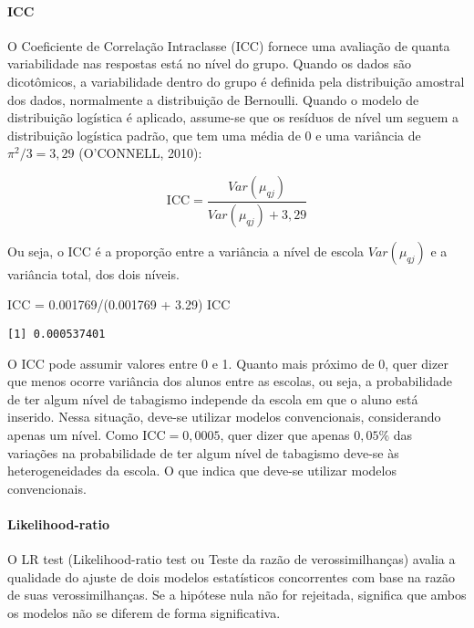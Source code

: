 \documentclass[
]{article}
\let\oldparagraph\paragraph
\renewcommand{\paragraph}[1]{\oldparagraph{#1}\mbox{}}
\newenvironment{Shaded}{\begin{snugshade}}{\end{snugshade}}
\newcommand{\FloatTok}[1]{\textcolor[rgb]{0.68,0.00,0.00}{#1}}
\newcommand{\NormalTok}[1]{\textcolor[rgb]{0.00,0.23,0.31}{#1}}
\newcommand{\OtherTok}[1]{\textcolor[rgb]{0.00,0.23,0.31}{#1}}
\newcommand{\SpecialCharTok}[1]{\textcolor[rgb]{0.37,0.37,0.37}{#1}}
\begin{document}
\hypertarget{icc}{%
\paragraph{ICC}\label{icc}}

O Coeficiente de Correlação Intraclasse (ICC) fornece uma avaliação de
quanta variabilidade nas respostas está no nível do grupo. Quando os
dados são dicotômicos, a variabilidade dentro do grupo é definida pela
distribuição amostral dos dados, normalmente a distribuição de
Bernoulli. Quando o modelo de distribuição logística é aplicado,
assume-se que os resíduos de nível um seguem a distribuição logística
padrão, que tem uma média de 0 e uma variância de \(\pi^2/3 = 3,29\)
(O'CONNELL, 2010):

\[
\text{ICC} = \frac{Var(\mu_{qj})}{Var(\mu_{qj}) + 3,29}
\]

Ou seja, o ICC é a proporção entre a variância a nível de escola
\(Var(\mu_{qj})\) e a variância total, dos dois níveis.

\begin{Shaded}
\begin{Highlighting}[]
\NormalTok{ICC }\OtherTok{=} \FloatTok{0.001769}\SpecialCharTok{/}\NormalTok{(}\FloatTok{0.001769} \SpecialCharTok{+} \FloatTok{3.29}\NormalTok{)}
\NormalTok{ICC}
\end{Highlighting}
\end{Shaded}

\begin{verbatim}
[1] 0.000537401
\end{verbatim}

O ICC pode assumir valores entre 0 e 1. Quanto mais próximo de 0, quer
dizer que menos ocorre variância dos alunos entre as escolas, ou seja, a
probabilidade de ter algum nível de tabagismo independe da escola em que
o aluno está inserido. Nessa situação, deve-se utilizar modelos
convencionais, considerando apenas um nível. Como
\(\text{ICC} = 0,0005\), quer dizer que apenas \(0,05\%\) das variações
na probabilidade de ter algum nível de tabagismo deve-se às
heterogeneidades da escola. O que indica que deve-se utilizar modelos
convencionais.

\hypertarget{likelihood-ratio}{%
\paragraph{Likelihood-ratio}\label{likelihood-ratio}}

O LR test (Likelihood-ratio test ou Teste da razão de verossimilhanças)
avalia a qualidade do ajuste de dois modelos estatísticos concorrentes
com base na razão de suas verossimilhanças. Se a hipótese nula não for
rejeitada, significa que ambos os modelos não se diferem de forma
significativa.
\end{document}
